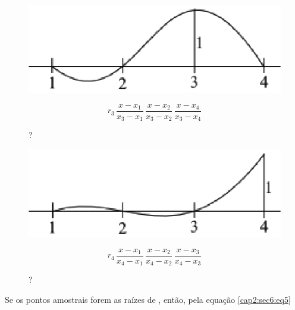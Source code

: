 \begin{enumerate}
\begin{example}
\begin{figure}[htb]
 \centering
 \begin{minipage}[c]{7cm}
    \includegraphics[scale=0.9]{capitulos/capitulo2/figuras/quadraturas_de_gauss4.eps}
    \caption{?}
    \label{fig:quadraturas_de_gauss4}
 \end{minipage}\hspace*{1cm}
 \begin{minipage}[c]{6cm}
    \[
     r_3 \, \frac{x-x_1}{x_3-x_1} \, \frac{x-x_2}{x_3-x_2} \, \frac{x-x_4}{x_3-x_4}
    \]
 \end{minipage}
\end{figure}

\begin{figure}[htb]
 \centering
 \begin{minipage}[c]{7cm}
    \includegraphics[scale=0.9]{capitulos/capitulo2/figuras/quadraturas_de_gauss5.eps}
    \caption{?}
    \label{fig:quadraturas_de_gauss5}
 \end{minipage}\hspace*{1cm}
 \begin{minipage}[c]{6cm}
    \[
     r_4 \, \frac{x-x_1}{x_4-x_1} \, \frac{x-x_2}{x_4-x_2} \, \frac{x-x_3}{x_4-x_3}
    \]
 \end{minipage}
\end{figure}

\end{example}

Se os pontos amostrais forem as  raízes de , então, pela equação \ref{cap2:sec6:eq5}


\end{enumerate}

